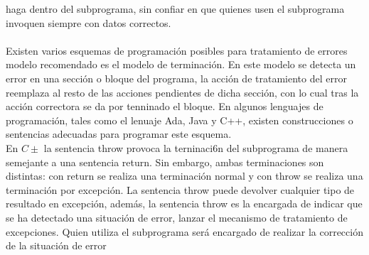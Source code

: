\documentclass[11pt,a4paper]{article}
\begin{document}
  haga dentro del subprograma, sin confiar en que quienes usen el subprograma
  invoquen siempre con datos correctos.\\
  \\
  Existen varios esquemas de programación posibles para tratamiento de errores modelo recomendado es el modelo de terminación. En este modelo se detecta un error en una sección o bloque del programa, la acción de tratamiento del error reemplaza al resto de las acciones pendientes de dicha
  sección, con lo cual tras la acción correctora se da por tenninado el bloque. En
  algunos lenguajes de programación, tales como el lenuaje Ada, Java y C++,
  existen construcciones o sentencias adecuadas para programar este esquema.\\
  En $C\pm$ la sentencia throw provoca la terninaci6n del subprograma de manera semejante a una sentencia return. Sin embargo, ambas terminaciones son distintas: con return se realiza una terminación normal y con throw se realiza una terminación por excepción. La sentencia throw puede devolver cualquier tipo
  de resultado en excepción, además, la sentencia throw es la encargada de
  indicar que se ha detectado una situación de error, lanzar el mecanismo de tratamiento de excepciones. Quien utiliza el subprograma será
  encargado de realizar la corrección de la situación de error
\end{document}
